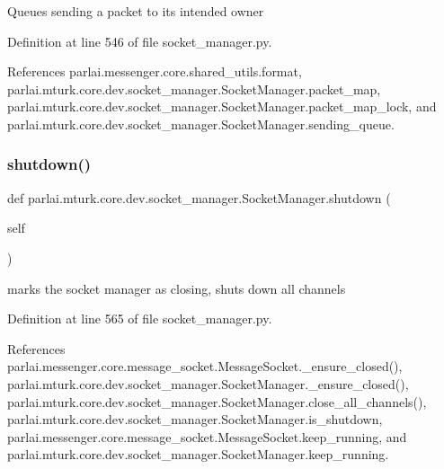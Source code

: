 \begin{DoxyVerb}Queues sending a packet to its intended owner\end{DoxyVerb}
 

Definition at line 546 of file socket\+\_\+manager.\+py.



References parlai.\+messenger.\+core.\+shared\+\_\+utils.\+format, parlai.\+mturk.\+core.\+dev.\+socket\+\_\+manager.\+Socket\+Manager.\+packet\+\_\+map, parlai.\+mturk.\+core.\+dev.\+socket\+\_\+manager.\+Socket\+Manager.\+packet\+\_\+map\+\_\+lock, and parlai.\+mturk.\+core.\+dev.\+socket\+\_\+manager.\+Socket\+Manager.\+sending\+\_\+queue.

\mbox{\label{classparlai_1_1mturk_1_1core_1_1dev_1_1socket__manager_1_1SocketManager_a708d0e46408b9a7259903f8896d1902b}} 
\subsubsection{\texorpdfstring{shutdown()}{shutdown()}}
{\footnotesize\ttfamily def parlai.\+mturk.\+core.\+dev.\+socket\+\_\+manager.\+Socket\+Manager.\+shutdown (\begin{DoxyParamCaption}\item[{}]{self }\end{DoxyParamCaption})}

\begin{DoxyVerb}marks the socket manager as closing, shuts down all channels\end{DoxyVerb}
 

Definition at line 565 of file socket\+\_\+manager.\+py.



References parlai.\+messenger.\+core.\+message\+\_\+socket.\+Message\+Socket.\+\_\+ensure\+\_\+closed(), parlai.\+mturk.\+core.\+dev.\+socket\+\_\+manager.\+Socket\+Manager.\+\_\+ensure\+\_\+closed(), parlai.\+mturk.\+core.\+dev.\+socket\+\_\+manager.\+Socket\+Manager.\+close\+\_\+all\+\_\+channels(), parlai.\+mturk.\+core.\+dev.\+socket\+\_\+manager.\+Socket\+Manager.\+is\+\_\+shutdown, parlai.\+messenger.\+core.\+message\+\_\+socket.\+Message\+Socket.\+keep\+\_\+running, and parlai.\+mturk.\+core.\+dev.\+socket\+\_\+manager.\+Socket\+Manager.\+keep\+\_\+running.

